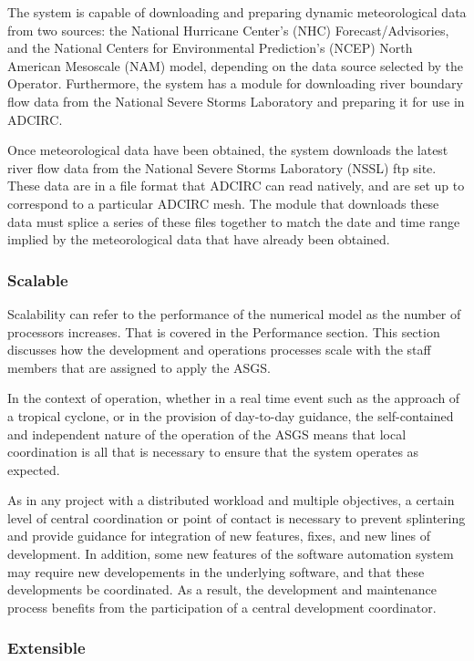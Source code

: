 \documentclass[12pt]{article}
\begin{document}
The system is capable of downloading and preparing dynamic 
meteorological data from two sources: the National Hurricane 
Center's (NHC) Forecast/Advisories, and the National Centers for 
Environmental Prediction's (NCEP) North American Mesoscale (NAM) 
model, depending on the data source selected by the Operator. 
Furthermore, the system has a module for downloading river boundary 
flow data from the National Severe Storms Laboratory and preparing 
it for use in ADCIRC.

Once meteorological data have been obtained, the system downloads 
the latest river flow data from the National Severe Storms 
Laboratory (NSSL) ftp site. These data are in a file format that 
ADCIRC can read natively, and are set up to correspond to a 
particular ADCIRC mesh. The module that downloads these data must 
splice a series of these files together to match the date and time 
range implied by the meteorological data that have already been 
obtained. 


\subsubsection{Scalable}

Scalability can refer to the performance of the numerical model as 
the number of processors increases. That is covered in the 
Performance section. This section discusses how the development and
operations processes scale with the staff members that are assigned 
to apply the ASGS. 

In the context of operation, whether in a real time event such as 
the approach of a tropical cyclone, or in the provision of 
day-to-day guidance, the self-contained and independent nature of 
the operation of the ASGS means that local coordination is all that is
necessary to ensure that the system operates as expected. 

As in any project with a distributed workload and multiple 
objectives, a certain level of central coordination or point of 
contact is necessary to prevent splintering and provide guidance for 
integration of new features, fixes, and new lines of development. In 
addition, some new features of the software automation system
may require new developements in the underlying software, and that these
developments be coordinated. As a result, the development and maintenance
process benefits from the participation of a central development 
coordinator. 


\subsubsection{Extensible}
\end{document}
